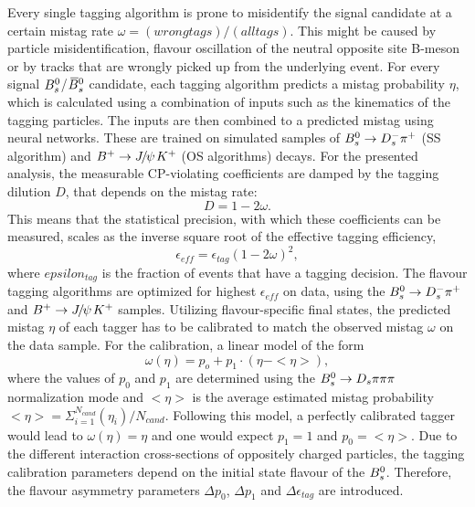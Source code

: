 Every single tagging algorithm is prone to misidentify the signal candidate at a certain mistag rate $\omega = (wrong tags)/ (all tags)$. 
This might be caused by particle misidentification, flavour oscillation of the neutral opposite site B-meson or by tracks that are wrongly picked up from the underlying event. 
For every signal ${{B}^0_{s}}$/${{\kern 0.18em\overline{\kern -0.18em B}{}}{}^0_{s}}$ candidate, each tagging algorithm predicts a mistag probability $\eta$, which is calculated using a combination of inputs such as the kinematics of the tagging particles. 
The inputs are then combined to a predicted mistag using neural networks. These are trained on simulated samples of ${{B}^0_{s}}\rightarrow{\ensuremath{{D}^-_{s}}}{\ensuremath{{\pi}^+}}$ (SS algorithm) and ${{B}^+}\rightarrow{\ensuremath{{J\mskip -3mu/\mskip -2mu\psi\mskip 2mu}}}{\ensuremath{{K}^+}}$ (OS algorithms) decays.
For the presented analysis, the measurable CP-violating coefficients are damped by the tagging dilution $D$, that depends on the mistag rate:
\begin{equation}
\label{eq: taggingDilution}
D = 1 - 2\omega.
\end{equation}
This means that the statistical precision, with which these coefficients can be measured, scales as the inverse square root of the effective tagging efficiency,
\begin{equation}
\label{eq: taggingEfficiency}
\epsilon_{eff} = \epsilon_{tag}(1 - 2\omega)^{2},
\end{equation}
where $epsilon_{tag}$ is the fraction of events that have a tagging decision. 
The flavour tagging algorithms are optimized for highest $\epsilon_{eff}$ on data, using the ${{B}^0_{s}}\rightarrow{\ensuremath{{D}^-_{s}}}{\ensuremath{{\pi}^+}}$ and ${{B}^+}\rightarrow{\ensuremath{{J\mskip -3mu/\mskip -2mu\psi\mskip 2mu}}}{\ensuremath{{K}^+}}$ samples. \newline
Utilizing flavour-specific final states, the predicted mistag $\eta$ of each tagger has to be calibrated to match the observed mistag $\omega$ on the data sample. 
For the calibration, a linear model of the form
\begin{equation}
\label{eq: mistagCalibration}
\omega(\eta) = p_{o} + p_{1} \cdot (\eta - < \eta >), 
\end{equation}  
where the values of $p_{0}$ and $p_{1}$ are determined using the ${{B}^0_{s}}\rightarrow{\ensuremath{{D}_{s}}}{\ensuremath{\pi}}{\ensuremath{\pi}}{\ensuremath{\pi}}$ normalization mode and $<\eta>$ is the average estimated mistag probability $<\eta> = \Sigma_{i=1}^{N_{cand}}(\eta_{i}) / N_{cand}$.
Following this model, a perfectly calibrated tagger would lead to $\omega(\eta) = \eta$ and one would expect $p_{1} = 1$ and $p_{0} = <\eta>$.
Due to the different interaction cross-sections of oppositely charged particles, the tagging calibration parameters depend on the initial state flavour of the ${{B}^0_{s}}$. 
Therefore, the flavour asymmetry parameters $\Delta p_{0}$, $\Delta p_{1}$ and $\Delta\epsilon_{tag}$ are introduced. 
